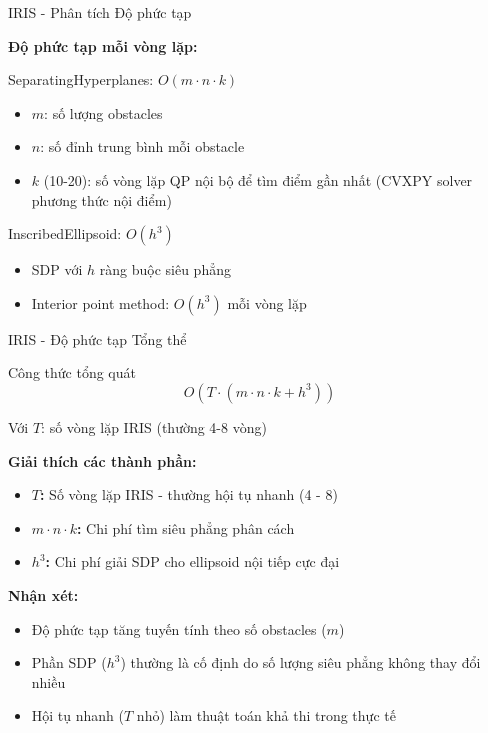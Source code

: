 \documentclass[aspectratio=169]{beamer}
\begin{document}
\begin{frame}{IRIS - Phân tích Độ phức tạp}

    \textbf{Độ phức tạp mỗi vòng lặp:}
    
    \vspace{0.5em}
    \begin{block}{SeparatingHyperplanes: $O(m \cdot n \cdot k)$}
        \small
        \begin{itemize}
            \item $m$: số lượng obstacles
            \item $n$: số đỉnh trung bình mỗi obstacle
            \item $k$ (10-20): số vòng lặp QP nội bộ để tìm điểm gần nhất (CVXPY solver phương thức nội điểm)
        \end{itemize}
    \end{block}

    \vspace{0.3em}
    \begin{block}{InscribedEllipsoid: $O(h^3)$}
        \small
        \begin{itemize}
            \item SDP với $h$ ràng buộc siêu phẳng
            \item Interior point method: $O(h^3)$ mỗi vòng lặp
        \end{itemize}
    \end{block}

\end{frame}

\begin{frame}{IRIS - Độ phức tạp Tổng thể}

    \begin{block}{Công thức tổng quát}
        \[
            O(T \cdot (m \cdot n \cdot k + h^3))
        \]
        
        \small
        Với $T$: số vòng lặp IRIS (thường 4-8 vòng)
    \end{block}

    \vspace{1em}
    \textbf{Giải thích các thành phần:}
    \begin{itemize}
        \item \textbf{$T$:} Số vòng lặp IRIS - thường hội tụ nhanh (4 - 8)
        \item \textbf{$m \cdot n \cdot k$:} Chi phí tìm siêu phẳng phân cách
        \item \textbf{$h^3$:} Chi phí giải SDP cho ellipsoid nội tiếp cực đại
    \end{itemize}

    \vspace{0.5em}
    \textbf{Nhận xét:}
    \begin{itemize}
        \item Độ phức tạp tăng tuyến tính theo số obstacles ($m$)
        \item Phần SDP ($h^3$) thường là cố định do số lượng siêu phẳng không thay đổi nhiều
        \item Hội tụ nhanh ($T$ nhỏ) làm thuật toán khả thi trong thực tế
    \end{itemize}

\end{frame}
\end{document}
